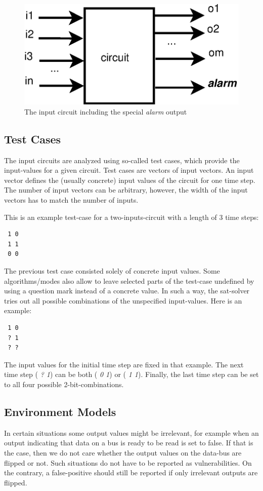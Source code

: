\documentclass[a4paper,10pt]{article}
\begin{document}
\begin{figure}[!htb]
\centering
\includegraphics[scale = 0.48]{img/circuit-in.eps}
\centering \caption{The input circuit including the special \emph{alarm} output} 
\label{circuit-in}
\end{figure}

\subsection{Test Cases}
The input circuits are analyzed using so-called test cases, which provide the input-values for a given circuit.
Test cases are vectors of input vectors. An input vector defines the (usually concrete) input values of the circuit for one time step.
The number of input vectors can be arbitrary, however, the width of the input vectors has to match the number of inputs.

This is an example test-case for a two-inputs-circuit with a length of 3 time steps:
\begin{verbatim}
 1 0
 1 1
 0 0
\end{verbatim}


The previous test case consisted solely of concrete input values. Some algorithms/modes also allow to leave selected parts of the test-case undefined by using
a question mark instead of a concrete value.
In such a way, the sat-solver tries out all possible combinations of the unspecified input-values. Here is an example:
\begin{verbatim}
 1 0
 ? 1
 ? ?
\end{verbatim}

The input values for the initial time step are fixed in that example. The next time step  (\emph{ ? 1}) can be both (\emph{ 0 1}) or (\emph{ 1 1}). Finally, the last time step
can be set to all four possible 2-bit-combinations.


\subsection{Environment Models}  \label{environment}
In certain situations some output values might be irrelevant, for example when an output indicating that data on a bus is ready to be read is set to false.
If that is the case, then we do not care whether the output values on the data-bus are flipped or not. Such situations do not have to be reported as
vulnerabilities. On the contrary, a false-positive should still be reported if only irrelevant outputs are flipped.
\end{document}
